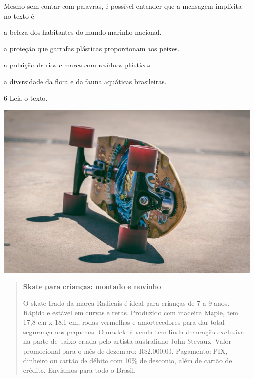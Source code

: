 Mesmo sem contar com palavras, é possível entender que a mensagem
implícita no texto é

\begin{escolha}
\item a beleza dos habitantes do mundo marinho nacional.

\item a proteção que garrafas plásticas proporcionam aos peixes.

\item a poluição de rios e mares com resíduos plásticos.

\item a diversidade da flora e da fauna aquáticas brasileiras.
\end{escolha}


\num{6} Leia o texto.


\includegraphics[width=5.25000in,height=3.47639in]{./media/simulados/image5.png}

\begin{quote}
\textbf{Skate para crianças: montado e novinho}

O skate Irado da marca Radicais é ideal para crianças de 7 a 9 anos.
Rápido e estável em curvas e retas. Produzido com madeira Maple, tem
17,8 cm x 18,1 cm, rodas vermelhas e amortecedores para dar total
segurança aos pequenos. O modelo à venda tem linda decoração exclusiva
na parte de baixo criada pelo artista australiano John Stevaux. Valor
promocional para o mês de dezembro: R\$2.000,00. Pagamento: PIX,
dinheiro ou cartão de débito com 10\% de desconto, além de cartão de
crédito. Enviamos para todo o Brasil.

\end{quote}


